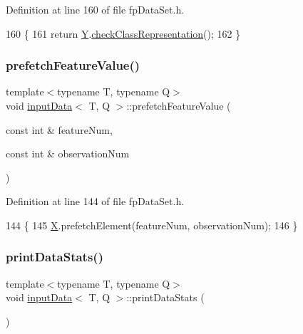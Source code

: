 Definition at line 160 of file fp\+Data\+Set.\+h.


\begin{DoxyCode}
160                     \{
161             \textcolor{keywordflow}{return} \hyperlink{classinputData_a03b936fe0070cee08153cb4853003ab4}{Y}.\hyperlink{classinputYDataClassification_a738130d6cf0ed15aff355d612aae67ca}{checkClassRepresentation}();
162         \}
\end{DoxyCode}
\mbox{\label{classinputData_af1637032057ee7aa01a19bd8d7583a95}} 
\subsubsection{\texorpdfstring{prefetch\+Feature\+Value()}{prefetchFeatureValue()}}
{\footnotesize\ttfamily template$<$typename T, typename Q$>$ \\
void \hyperlink{classinputData}{input\+Data}$<$ T, Q $>$\+::prefetch\+Feature\+Value (\begin{DoxyParamCaption}\item[{const int \&}]{feature\+Num,  }\item[{const int \&}]{observation\+Num }\end{DoxyParamCaption})\hspace{0.3cm}{\ttfamily [inline]}}



Definition at line 144 of file fp\+Data\+Set.\+h.


\begin{DoxyCode}
144                                                                                   \{
145             \hyperlink{classinputData_a31bffca53fea1a24c237e543cc5489a0}{X}.prefetchElement(featureNum, observationNum);
146         \}
\end{DoxyCode}
\mbox{\label{classinputData_ab6fad11a73fdfc33bbfa7a90b05e43b7}} 
\subsubsection{\texorpdfstring{print\+Data\+Stats()}{printDataStats()}}
{\footnotesize\ttfamily template$<$typename T, typename Q$>$ \\
void \hyperlink{classinputData}{input\+Data}$<$ T, Q $>$\+::print\+Data\+Stats (\begin{DoxyParamCaption}{ }\end{DoxyParamCaption})\hspace{0.3cm}{\ttfamily [inline]}}



